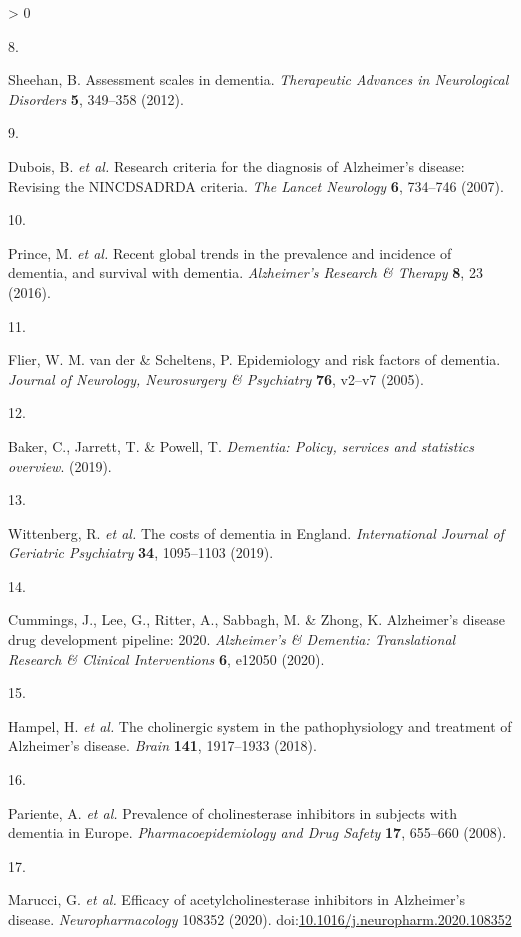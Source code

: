 \documentclass[a4paper, twoside]{templates/ociamthesis}
\newlength{\cslhangindent}
\newlength{\csllabelwidth}
\newenvironment{CSLReferences}[3] %
 {%
  \setlength{\parindent}{0pt}
  \ifodd #1 \everypar{\setlength{\hangindent}{\cslhangindent}}\ignorespaces\fi
  \ifnum #2 > 0
  \setlength{\parskip}{#2\baselineskip}
  \fi
 }%
 {}
\newcommand{\CSLLeftMargin}[1]{\parbox[t]{\maxof{\widthof{#1}}{\csllabelwidth}}{#1}}
\newcommand{\CSLRightInline}[1]{\parbox[t]{\linewidth - \csllabelwidth}{#1}}
\begin{document}
\begin{CSLReferences}{0}{0}
\leavevmode\hypertarget{ref-sheehan2012}{}%
\CSLLeftMargin{8. }
\CSLRightInline{Sheehan, B. Assessment scales in dementia. \emph{Therapeutic Advances in Neurological Disorders} \textbf{5}, 349--358 (2012).}

\leavevmode\hypertarget{ref-dubois2007}{}%
\CSLLeftMargin{9. }
\CSLRightInline{Dubois, B. \emph{et al.} Research criteria for the diagnosis of {Alzheimer}'s disease: Revising the {NINCDS}{{ADRDA}} criteria. \emph{The Lancet Neurology} \textbf{6}, 734--746 (2007).}

\leavevmode\hypertarget{ref-prince2016}{}%
\CSLLeftMargin{10. }
\CSLRightInline{Prince, M. \emph{et al.} Recent global trends in the prevalence and incidence of dementia, and survival with dementia. \emph{Alzheimer's Research \& Therapy} \textbf{8}, 23 (2016).}

\leavevmode\hypertarget{ref-flier2005}{}%
\CSLLeftMargin{11. }
\CSLRightInline{Flier, W. M. van der \& Scheltens, P. Epidemiology and risk factors of dementia. \emph{Journal of Neurology, Neurosurgery \& Psychiatry} \textbf{76}, v2--v7 (2005).}

\leavevmode\hypertarget{ref-baker2019}{}%
\CSLLeftMargin{12. }
\CSLRightInline{Baker, C., Jarrett, T. \& Powell, T. \emph{Dementia: Policy, services and statistics overview}. (2019).}

\leavevmode\hypertarget{ref-wittenberg2019}{}%
\CSLLeftMargin{13. }
\CSLRightInline{Wittenberg, R. \emph{et al.} The costs of dementia in {England}. \emph{International Journal of Geriatric Psychiatry} \textbf{34}, 1095--1103 (2019).}

\leavevmode\hypertarget{ref-cummings2020}{}%
\CSLLeftMargin{14. }
\CSLRightInline{Cummings, J., Lee, G., Ritter, A., Sabbagh, M. \& Zhong, K. Alzheimer's disease drug development pipeline: 2020. \emph{Alzheimer's \& Dementia: Translational Research \& Clinical Interventions} \textbf{6}, e12050 (2020).}

\leavevmode\hypertarget{ref-hampel2018}{}%
\CSLLeftMargin{15. }
\CSLRightInline{Hampel, H. \emph{et al.} The cholinergic system in the pathophysiology and treatment of {Alzheimer}'s disease. \emph{Brain} \textbf{141}, 1917--1933 (2018).}

\leavevmode\hypertarget{ref-pariente2008}{}%
\CSLLeftMargin{16. }
\CSLRightInline{Pariente, A. \emph{et al.} Prevalence of cholinesterase inhibitors in subjects with dementia in {Europe}. \emph{Pharmacoepidemiology and Drug Safety} \textbf{17}, 655--660 (2008).}

\leavevmode\hypertarget{ref-marucci2020}{}%
\CSLLeftMargin{17. }
\CSLRightInline{Marucci, G. \emph{et al.} Efficacy of acetylcholinesterase inhibitors in {Alzheimer}'s disease. \emph{Neuropharmacology} 108352 (2020). doi:\href{https://doi.org/10.1016/j.neuropharm.2020.108352}{10.1016/j.neuropharm.2020.108352}}


\end{CSLReferences}
\end{document}
